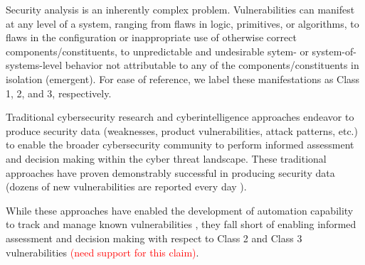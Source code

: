 Security analysis is an inherently complex problem.  Vulnerabilities can manifest at any level of a system, ranging from flaws in logic, primitives, or algorithms, to flaws in the configuration or inappropriate use of otherwise correct components/constituents, to unpredictable and undesirable sytem- or system-of-systems-level behavior not attributable to any of the components/constituents in isolation (emergent).  For ease of reference, we label these manifestations as Class 1, 2, and 3, respectively.  

Traditional cybersecurity research and cyberintelligence approaches endeavor to produce security data (weaknesses, product vulnerabilities, attack patterns, etc.) to enable the broader cybersecurity community to perform informed assessment and decision making within the cyber threat landscape.  These traditional approaches have proven demonstrably successful in producing security data (dozens of new vulnerabilities are reported every day \cite{noauthor_browse_nodate}).  

While these approaches have enabled the development of automation capability to track and manage known vulnerabilities \cite{noauthor_cve_nodate}, they fall short of enabling informed assessment and decision making with respect to Class 2 and Class 3 vulnerabilities \textcolor{red}{(need support for this claim)}.




